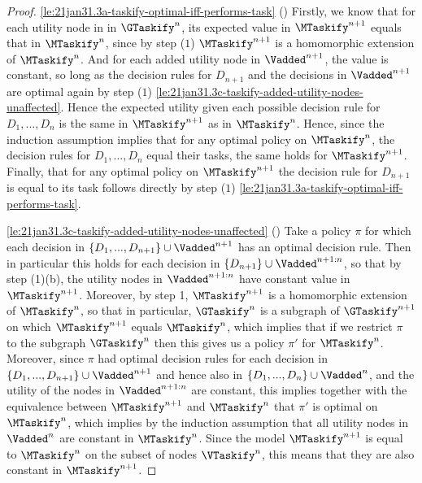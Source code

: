 \begin{proof}
\ref{le:21jan31.3a-taskify-optimal-iff-performs-task} {(\TaskifySublemmaPerformsTheirTaskName)} Firstly, we know that for each utility node in in $\GTaskify^n$, its expected value in $\MTaskify^{n+1}$ equals that in $\MTaskify^n$, since by 
step ($1$) $\MTaskify^{n+1}$ is a homomorphic extension of $\MTaskify^{n}$. And for each added utility node in $\Vadded^{n+1}$, the value is constant, so long as the decision rules for $D_{n+1}$ and the decisions in $\Vadded^{n+1}$ are optimal again by step ($1$) \ref{le:21jan31.3c-taskify-added-utility-nodes-unaffected}. Hence the expected utility given each possible decision rule for $D_1,...,D_n$ is the same in $\MTaskify^{n+1}$ as in $\MTaskify^n$. Hence, since the induction assumption implies that for any optimal policy on $\MTaskify^n$, the decision rules for $D_1,...,D_n$ equal their tasks, the same holds for $\MTaskify^{n+1}$. 
Finally, that for any optimal policy on $\MTaskify^{n+1}$ the decision rule for $D_{n+1}$ is equal to its task follows directly by step ($1$) \ref{le:21jan31.3a-taskify-optimal-iff-performs-task}.



\ref{le:21jan31.3c-taskify-added-utility-nodes-unaffected} {(\TaskifySublemmaAddedUtilityNodesName)}
Take a policy $\pi$ for which each decision in $\{D_1,...,D_{n+1}\}\cup\Vadded^{n+1}$ has an optimal decision rule. Then in particular this holds for each decision in $\{D_{n+1}\}\cup \Vadded^{n+1:n}$, so that by step (1)(b), the 
utility nodes in $\Vadded^{n+1:n}$ have constant value in $\MTaskify^{n+1}$. Moreover, by step 1, $\MTaskify^{n+1}$ is a homomorphic extension of $\MTaskify^n$, so that in particular, $\GTaskify^{n}$ is a subgraph of $\GTaskify^{n+1}$ on which $\MTaskify^{n+1}$ equals $\MTaskify^n$, which implies that if we restrict $\pi$ to the subgraph $\GTaskify^n$ then this gives us a 
policy $\pi'$ for $\MTaskify^n$. Moreover, since $\pi$ had optimal decision rules for each decision in $\{D_1,...,D_{n+1}\}\cup\Vadded^{n+1}$ and hence also in $\{D_1,...,D_{n}\}\cup\Vadded^{n}$, and the utility of the nodes in $\Vadded^{n+1:n}$ are constant, this implies together with the equivalence between $\MTaskify^{n+1}$ and $\MTaskify^n$ that 
$\pi'$ is optimal on $\MTaskify^n$, which implies by the induction assumption that all utility nodes in $\Vadded^n$ are constant in $\MTaskify^n$. Since the model $\MTaskify^{n+1}$ is equal to $\MTaskify^n$ on the subset of nodes $\VTaskify^n$, this means that they are also constant in $\MTaskify^{n+1}$. 
\end{proof}




































    

